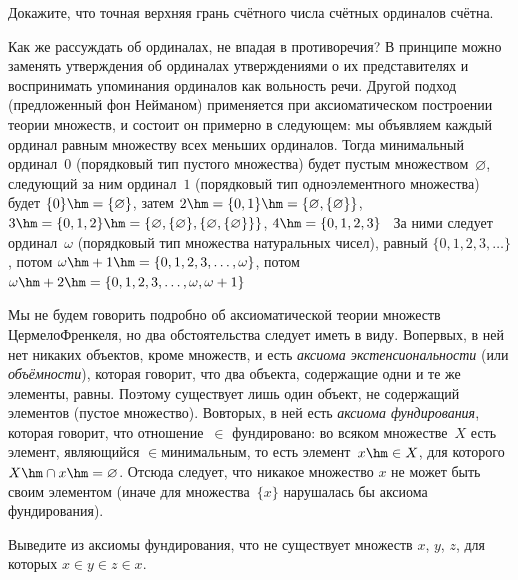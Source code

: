 \begin{problem}
Докажите, что точная верхняя грань счётного числа счётных
ординалов счётна.
\end{problem}

Как же рассуждать об ординалах, не впадая в противоречия? В
принципе можно заменять утверждения об ординалах утверждениями о
их представителях и воспринимать упоминания ординалов как 
вольность речи.
Другой подход (предложенный фон Нейманом)
применяется при аксиоматическом
построении теории множеств, и состоит он примерно в следующем:
мы объявляем каждый ординал равным множеству всех меньших
ординалов. Тогда минимальный ординал~$0$ (порядковый тип пустого
множества) будет пустым множеством~$\varnothing$, следующий за
ним ординал~$1$ (порядковый тип одноэлементного множества) будет
$\{0\}\hm=\{\varnothing\}$, затем
$2\hm=\{0,1\}\hm=\{\varnothing, \{\varnothing\}\}$,
$3\hm=\{0,1,2\}\hm=\{\varnothing, \{\varnothing\},
\{\varnothing, \{\varnothing\}\}\}$,
$4\hm=\{0,1,2,3\}$~
За ними следует ординал~$\omega$ (порядковый тип множества
натуральных чисел), равный $\{0,1,2,3,\dots\}$, потом
$\omega\hm+1\hm= \{0,1,2,3,\dots,\omega\}$, потом $\omega\hm+2\hm=
\{0,1,2,3,\dots,\omega,\omega+1\}$~

Мы не будем говорить подробно об аксиоматической теории множеств%
Цермело\ч Френкеля,
но два обстоятельства
следует иметь в виду.
Во\д первых, в ней нет никаких объектов, кроме множеств, и есть
\emph{аксиома экстенсиональности} (или \emph{объёмности}),
которая говорит, что два объекта, содержащие одни и те же
элементы, равны. Поэтому существует лишь один объект, не
содержащий элементов (пустое множество). Во\д вторых, в ней есть
\emph{аксиома фундирования}, которая говорит, что
отношение~$\in$ фундировано: во всяком множестве~$X$ есть
элемент, являющийся $\in$\д минимальным, то есть
элемент~$x\hm\in X$, для которого $X\hm\cap x\hm=\varnothing$.
Отсюда следует, что
никакое множество $x$ не может быть своим
элементом (иначе для множества~$\{x\}$ нарушалась бы аксиома фундирования).

\begin{problem}
Выведите из аксиомы фундирования, что не существует множеств
$x$, $y$, $z$, для которых $x\in y \in z \in x$.
\end{problem}

